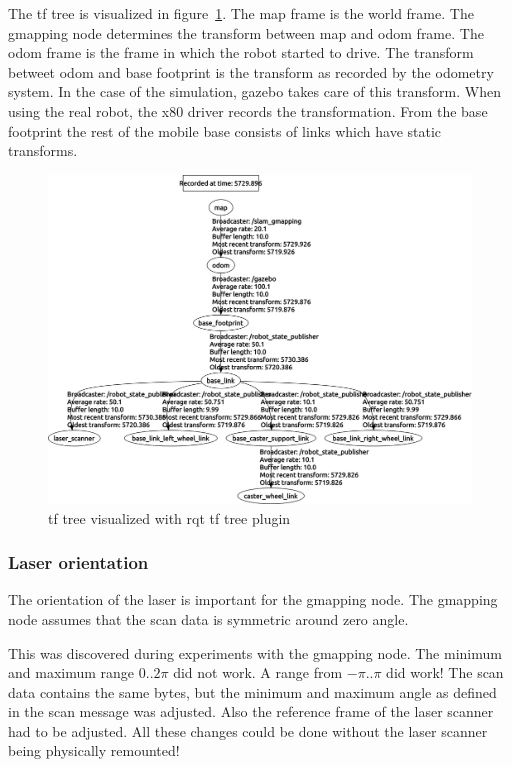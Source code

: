 \documentclass[a4paper]{article}
\begin{document}
The tf tree is visualized in figure~\ref{fig:tftreesim}. The map
frame is the world frame. The gmapping node determines the transform between map and odom
frame. The odom frame is the frame in which the robot started to drive. The transform
betweet odom and base footprint is the transform as recorded by the odometry system.
In the case of the simulation, gazebo takes care of this transform. When using the
real robot, the x80 driver records the transformation. From the base footprint the rest
of the mobile base consists of links which have static transforms.

\begin{figure}[h!]
  \centering
  \includegraphics[width=\textwidth,height=\textheight,keepaspectratio]{img/tf_tree_simulation.png}
  \caption{tf tree visualized with rqt tf tree plugin}
  \label{fig:tftreesim}
\end{figure}

\subsubsection{Laser orientation}
The orientation of the laser is important for the gmapping node. The gmapping node assumes that
the scan data is symmetric around zero angle.

This was discovered during experiments with the gmapping node.
The minimum and maximum range
$0 .. 2\pi$ did not work. A range from $-\pi .. \pi$ did work!
The scan data contains the same bytes, but the minimum and maximum angle
as defined in the scan message was adjusted. Also the reference frame
of the laser scanner had to be adjusted. All these changes could be done
without the laser scanner being physically remounted!
\end{document}
